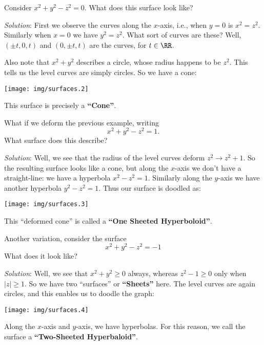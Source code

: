 \begin{example}
Consider $x^{2}+y^{2}-z^{2}=0$. What does this surface look like?

\emph{Solution}: First we observe the curves along the $x$-axis,
i.e., when $y=0$ is $x^{2}=z^{2}$. Similarly when $x=0$ we have
$y^{2}=z^{2}$. What sort of curves are these? Well, $(\pm t,0,t)$
and $(0,\pm t,t)$ are the curves, for $t\in\RR$. 

Also note that $x^{2}+y^{2}$ describes a circle, whose radius
happens to be $z^{2}$. This tells us the level curves are simply
circles. So we have a cone: 
\begin{center}
  \texttt{[image: img/surfaces.2]}  
\end{center}
This surface is precisely a \textbf{``Cone''}.
\end{example}
\begin{example}
What if we deform the previous example, writing
\begin{equation}
x^{2}+y^{2}-z^{2}=1.
\end{equation}
What surface does this describe?

\emph{Solution}: Well, we see that the radius of the level curves
deform $z^{2}\to z^{2}+1$. So the resulting surface looks like a
cone, but along the $x$-axis we don't have a straight-line: we
have a hyperbola $x^{2}-z^{2}=1$. Similarly along the $y$-axis we
have another hyperbola $y^{2}-z^{2}=1$. Thus our surface is
doodled as:
\begin{center}
\texttt{[image: img/surfaces.3]}
\end{center}
This ``deformed cone'' is called a \textbf{``One Sheeted Hyperboloid''}.
\end{example}
\begin{example}
Another variation, consider the surface
\begin{equation}
x^{2}+y^{2}-z^{2}=-1
\end{equation}
What does it look like?

\emph{Solution}: Well, we see that $x^{2}+y^{2}\geq0$ always,
whereas $z^{2}-1\geq0$ only when $|z|\geq1$. So we have two
``surfaces'' or \textbf{``Sheets''} here. The level curves are
again circles, and this enables us to doodle the graph:
\begin{center}
\texttt{[image: img/surfaces.4]}
\end{center}
Along the $x$-axis and $y$-axis, we have hyperbolas. For this
reason, we call the surface a \textbf{``Two-Sheeted Hyperbaloid''}.
\end{example}

